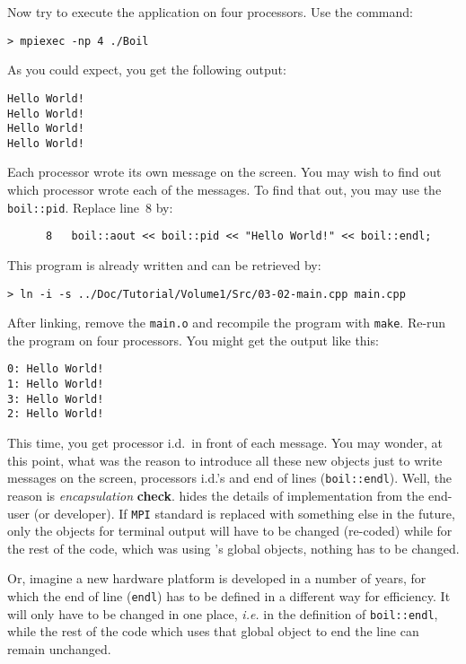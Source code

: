 Now try to execute the application on four processors. Use the command:
%
\begin{verbatim}
> mpiexec -np 4 ./Boil
\end{verbatim}
%
As you could expect, you get the following output:
%
{\small \begin{verbatim}
Hello World!
Hello World!
Hello World!
Hello World!
\end{verbatim}}
%
Each processor wrote its own message on the screen. You may wish to find out 
which processor wrote each of the messages. To find that out, you may use
the {\tt boil::pid}. Replace line~8 by:
%
{\small \begin{verbatim}
      8   boil::aout << boil::pid << "Hello World!" << boil::endl;
\end{verbatim}}
%
This program is already written and can be retrieved by:
%
\begin{verbatim}
> ln -i -s ../Doc/Tutorial/Volume1/Src/03-02-main.cpp main.cpp
\end{verbatim}
%
After linking, remove the {\tt main.o} and recompile the program with {\tt make}.
Re-run the program on four processors. You might get the output like this:
%
{\small \begin{verbatim}
0: Hello World!
1: Hello World!
3: Hello World!
2: Hello World!
\end{verbatim}}
%
This time, you get processor i.d.\ in front of each message. You may wonder,
at this point, what was the reason to introduce all these new objects just to
write messages on the screen, processors i.d.'s and end of lines 
({\tt boil::endl}). Well, the reason is {\em encapsulation} {\bf check}. 
{\psiboil} hides the details of implementation from the end-user (or developer). 
If {\tt MPI} standard is replaced with something else in the future, only the
{\psiboil} objects for terminal output will have to be changed (re-coded)
while for the rest of the code, which was using {\psiboil}'s global 
objects, nothing has to be changed.

Or, imagine a new hardware platform is developed in a number of years, for 
which the end of line ({\tt endl}) has to be defined in a different way for
efficiency. It will only have to be changed in one place, {\em i.e.} in the
definition of {\tt boil::endl}, while the rest of the code which uses that
global object to end the line can remain unchanged.

